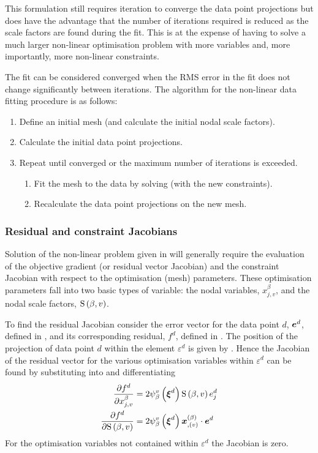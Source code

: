 This formulation still requires iteration to converge the data point
projections but does have the advantage that the number of iterations required
is reduced as the scale factors are found during the fit. This is at the
expense of having to solve a much larger non-linear optimisation problem with
more variables and, more importantly, more non-linear constraints.

The fit can be considered converged when the RMS error in the fit does not
change significantly between iterations.  The algorithm for the non-linear data
fitting procedure is as follows:
\begin{enumerate}
\item Define an initial mesh (and calculate the initial nodal scale factors).
\item Calculate the initial data point projections.
\item Repeat until converged or the maximum number of iterations is exceeded.
  \begin{enumerate}
  \item Fit the mesh to the data by solving  (with
    the new constraints).
  \item Recalculate the data point projections on the new mesh.
  \end{enumerate}
\end{enumerate}

\subsubsection{Residual and constraint Jacobians}
\label{sec:resandcontjacs}

Solution of the non-linear problem given in  will
generally require the evaluation of the objective gradient (or residual vector
Jacobian) and the constraint Jacobian with respect to the optimisation (mesh)
parameters. These optimisation parameters fall into two basic types of
variable: the nodal variables, $x^{\beta}_{j,v}$, and the nodal scale
factors, $   \mathrm{S} \left( \beta,v \right)  $.

To find the residual Jacobian consider the error vector for the data point
$d$, $\boldsymbol{e}^{d}$, defined in , and its
corresponding residual, $f^{d}$, defined in . The
position of the projection of data point $d$ within the element
$\varepsilon^{d}$ is given by . Hence the
Jacobian of the residual vector for the various optimisation variables within
$\varepsilon^{d}$ can be found by substituting
 into
 and differentiating \ie
\begin{align}
  \delby{f^{d}}{x^{\beta}_{j,v}}&=2\gbfn{\beta}{v}{
    \vectr{\xi}^{d}}\gsf{\beta}{v}e^{d}_{j} 
  \label{eqn:dataresjacnodevars} \\
  \delby{f^{d}}{\gsf{\beta}{v}}&=2\gbfn{\beta}{v}{\vectr{\xi}^{d}}
  \dotprod{\vectr{x}^{\pbrac{\beta}}_{,\pbrac{v}}}{\vectr{e}^{d}}
  \label{eqn:dataresjacsfvars}
\end{align}
For the optimisation variables not contained within $\varepsilon^{d}$ the
Jacobian is zero.
  
